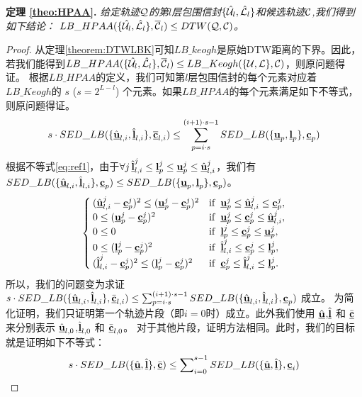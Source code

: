 \textbf{定理 \ref{theo:HPAA}. }{\em 	给定轨迹$\cal Q$的第$l$层包围信封$\{\hat{{\cal U}}_{l}, \hat{{\cal L}}_{l}\}$和候选轨迹$\cal C$,我们得到如下结论：
	$LB\_HPAA({  \{\hat{{\cal U}_{l}}, \hat{{\cal L}_{l}}\},\overline{{\cal C}}_{l}}) \le DTW(\cal Q, \cal C)$。}
\begin{proof}
	从定理\ref{theorem:DTWLBK}可知$LB\_keogh$是原始DTW距离的下界。因此，若我们能得到$LB\_HPAA({  \{\hat{{\cal U}_{l}}, \hat{{\cal L}_{l}}\},\overline{{\cal C}}_{l}}) \le LB\_Keogh({\{\cal U,\cal L\},{\cal C}}) $，则原问题得证。
根据$LB\_HPAA$的定义，我们可知第$l$层包围信封的每个元素对应着$LB\_Keogh$的 $s$ ($s=2^{L-l}$) 个元素。如果$LB\_HPAA$的每个元素满足如下不等式，则原问题得证。
	\begin{eqnarray}\label{eq:tmp1}
	s \cdot	SED\_LB(\{ \hat{\emph{{\textbf{u}}}}_{l,i}, \hat{\emph{{\textbf{l}}}}_{l,i} \}, \overline{\emph{{\textbf{c}}}}_{l,i}) \le
	\sum_{p=i \cdot s}^{(i+1)\cdot s-1} SED\_LB(\{{\emph{{\textbf{u}}}_{p}},\emph{{\textbf{l}}}_{p} \},\emph{{\textbf{c}}}_{p})\nonumber
	\end{eqnarray}
	根据不等式\ref{eq:ref1}，由于$\forall j \,  \hat{\emph{{\textbf{l}}}}_{l,i}^{j}\le \emph{{\textbf{l}}}_{p}^{j}\le \emph{{\textbf{u}}}_{p}^{j}\le \hat{\emph{{\textbf{u}}}}_{l,i}^{j}$，我们有$SED\_LB ( \{ \hat{\emph{{\textbf{u}}}}_{l,i}, \hat{\emph{{\textbf{l}}}}_{l,i} \}, \emph{{\textbf{c}}}_{p}) \le
	SED\_LB ( \{ {\emph{{\textbf{u}}}_{p}}, \emph{{\textbf{l}}}_{p} \}, \emph{{\textbf{c}}}_{p})$。
	\begin{equation}\label{eq:ref1}
	\begin{cases}
	(\hat{\emph{{\textbf{u}}}}_{l,i}^{j}- {\emph{{\textbf{c}}}}_{p}^{j})^2 \le ({\emph{{\textbf{u}}}}_{p}^{j} - {\emph{{\textbf{c}}}}_{p}^{j})^2 & {\rm if}  \,\,\,   \emph{{\textbf{u}}}_{p}^{j} \le  \hat{\emph{{\textbf{u}}}}_{l,i}^{j} \le {\emph{{\textbf{c}}}}_{p}^{j},  \\
	0	\le ({\emph{{\textbf{u}}}}_{p}^{j} - {\emph{{\textbf{c}}}}_{p}^{j})^2 &	{\rm if} \,\,\,   \emph{{\textbf{u}}}_{p}^{j} \le {\emph{{\textbf{c}}}}_{p}^{j} \le  \hat{\emph{{\textbf{u}}}}_{l,i}^{j},  \\
	0 \le 0 &	{\rm if}  \,\,\,     \emph{{\textbf{l}}}_{p}^{j} \le   {\emph{{\textbf{c}}}}_{p}^{j} \le    \emph{{\textbf{u}}}_{p}^{j},  \\
	0 \le ({\emph{{\textbf{l}}}}_{p}^{j} - {\emph{{\textbf{c}}}}_{p}^{j})^2 &	{\rm if} \,\,\,   \hat{\emph{{\textbf{l}}}}_{l,i}^{j} \le   {\emph{{\textbf{c}}}}_{p}^{j} \le  \emph{{\textbf{l}}}_{p}^{j},  \\
	(\hat{\emph{{\textbf{l}}}}_{l,i}^{j}- {\emph{{\textbf{c}}}}_{p}^{j})^2 \le ({\emph{{\textbf{l}}}}_{p}^{j} - {\emph{{\textbf{c}}}}_{p}^{j})^2 & {\rm if}  \,\,\,  {\emph{{\textbf{c}}}}_{p}^{j} \le \hat{\emph{{\textbf{l}}}}_{l,i}^{j} \le  \emph{{\textbf{l}}}_{p}^{j}.
	\end{cases}
	\end{equation}
	所以，我们的问题变为求证$s \cdot	SED\_LB(\{ \hat{\emph{{\textbf{u}}}}_{l,i}, \hat{\emph{{\textbf{l}}}}_{l,i} \}, \bar{\emph{{\textbf{c}}}}_{l,i})  \le	\sum\nolimits_{p=i \cdot s}^{(i+1)\cdot s-1} SED\_LB(\{ \hat{\emph{{\textbf{u}}}}_{l,i}, \hat{\emph{{\textbf{l}}}}_{l,i} \}, \emph{{\textbf{c}}}_{p})$ 成立。
为简化证明，我们只证明第一个轨迹片段（即$i=0$时）成立。此外我们使用  $\hat{\emph{{\textbf{u}}}}$,$\hat{\emph{{\textbf{l}}}}$ 和 $\bar{\emph{{\textbf{c}}}}$ 来分别表示  $\hat{\emph{{\textbf{u}}}}_{l,0}$,$\hat{\emph{{\textbf{l}}}}_{l,0}$ 和 $\bar{\emph{{\textbf{c}}}}_{l,0}$。 对于其他片段，证明方法相同。此时，我们的目标就是证明如下不等式：
	\begin{eqnarray}\label{eq:transZero}
	s	\cdot	SED\_LB(\{ \hat{\emph{{\textbf{u}}}}, \hat{\emph{{\textbf{l}}}} \}, \bar{\emph{{\textbf{c}}}}) \le \sum\nolimits_{i=0}^{s-1}SED\_LB(\{ \hat{\emph{{\textbf{u}}}}, \hat{\emph{{\textbf{l}}}} \}, \emph{{\textbf{c}}}_{i})
	\end{eqnarray}
	

\end{proof}
